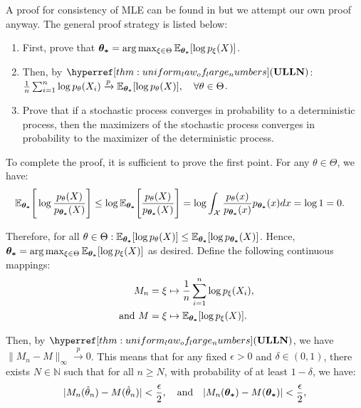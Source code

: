 \begin{proof*}
    A proof for consistency of MLE can be found in \cite[Theorem 2.5]{book:newey1994} but we attempt our own proof anyway. The general proof strategy is listed below:
    \begin{enumerate}
        \item First, prove that $\boldsymbol{\theta_*}=\arg\max_{\xi\in\Theta}\mathbb{E}_{\boldsymbol{\theta_*}} [\log p_\xi(X)]$. 
        \item Then, by $\ULLN$: $\frac{1}{n}\sum_{i=1}^n \log p_\theta(X_i)\xrightarrow{p}\mathbb{E}_{\boldsymbol{\theta_*}}[\log p_\theta(X)], \quad \forall \theta\in\Theta$.
        \item Prove that if a stochastic process converges in probability to a deterministic process, then the maximizers of the stochastic process converges in probability to the maximizer of the deterministic process.
    \end{enumerate} 

    \noindent To complete the proof, it is sufficient to prove the first point. For any $\theta\in\Theta$, we have:
    \begin{align*}
        \mathbb{E}_{\boldsymbol{\theta_*}}\Bigg[ 
            \log \frac{p_\theta(X)}{p_{\boldsymbol{\theta_*}}(X)}
         \Bigg] &\le \log\mathbb{E}_{\boldsymbol{\theta_*}}\Bigg[ 
            \frac{p_\theta(X)}{p_{\boldsymbol{\theta_*}}(X)}
         \Bigg] = \log\int_\mathcal{X} \frac{p_\theta(x)}{p_{\boldsymbol{\theta_*}}(x)}p_{\boldsymbol{\theta_*}}(x)dx = \log 1 = 0.
    \end{align*} 

    \noindent Therefore, for all $\theta\in\Theta:\mathbb{E}_{\boldsymbol{\theta_*}}[\log p_\theta(X)]\le \mathbb{E}_{\boldsymbol{\theta_*}}[\log p_{\boldsymbol{\theta_*}}(X)]$. Hence, $\boldsymbol{\theta_*}=\arg\max_{\xi\in\Theta}\mathbb{E}_{\boldsymbol{\theta_*}} [\log p_\xi(X)]$ as desired. Define the following continuous mappings:
    \begin{align*}
        M_n &= \xi \mapsto \frac{1}{n} \sum_{i=1}^n \log p_\xi(X_i), \\
        \text{ and } M &= \xi \mapsto \mathbb{E}_{\boldsymbol{\theta_*}}[\log p_\xi(X)]. 
    \end{align*} 

    \noindent Then, by $\ULLN$, we have $\|M_n - M\|_\infty \xrightarrow{p} 0$. This means that for any fixed $\epsilon>0$ and $\delta\in(0,1)$, there exists $N\in\mathbb{N}$ such that for all $n\ge N$, with probability of at least $1-\delta$, we have:
    \begin{align*}
        |M_n(\hat\theta_n) - M(\hat\theta_n)| < \frac{\epsilon}{2}, \quad \text{and} \quad |M_n(\boldsymbol{\theta_*}) - M(\boldsymbol{\theta_*})| < \frac{\epsilon}{2},
    \end{align*} 


\end{proof*}
